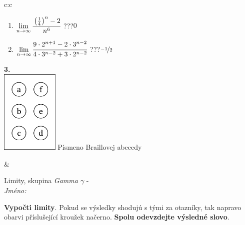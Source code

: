 \documentclass[10pt]{report}
\begin{document}
\begin{tabular}{c:c}
\begin{minipage}[c][104.5mm][t]{0.5\linewidth}
\begin{center}
\begin{minipage}{0.79\linewidth}
\begin{center}
\begin{varwidth}{\linewidth}
\begin{enumerate}
\item $\lim\limits_{n\to\infty}\cfrac{\left(\frac{1}{4}\right)^n -2}{n^{6}}$\quad \dotfill\; ???\;\dotfill \quad $0$
\item $\lim\limits_{n\to\infty}\cfrac{9\cdot 2^{n+1}-2\cdot 3^{n-2}}{4\cdot 3^{n-2}+3\cdot 2^{n-2}}$\quad \dotfill\; ???\;\dotfill \quad $\nicefrac{-1}{2}$
\end{enumerate}
\end{varwidth}
\end{center}
\end{minipage}
\begin{minipage}{0.20\linewidth}
\begin{center}
{\Huge\bfseries 3.} \\[2mm]
\includegraphics[height=40mm]{../images/braille.png}
{\small Písmeno Braillovej abecedy}
\end{center}
\end{minipage}
\end{center}
\end{minipage}
&
\begin{minipage}[c][104.5mm][t]{0.5\linewidth}
\begin{center}
\vspace{7mm}
{\huge Limity, skupina \textit{Gamma $\gamma$} -}\\[5mm]
\textit{Jméno:}\phantom{xxxxxxxxxxxxxxxxxxxxxxxxxxxxxxxxxxxxxxxxxxxxxxxxxxxxxxxxxxxxxxxxx}\\[5mm]
\begin{minipage}{0.95\linewidth}
\begin{center}
\textbf{Vypočti limity}. Pokud se výsledky shodujú s tými za otazníky, tak napravo\\obarvi příslušející kroužek načerno. \textbf{Spolu odevzdejte výsledné slovo}.
\end{center}
\end{minipage}
\\[1mm]
\begin{minipage}{0.79\linewidth}
\begin{center}
\begin{varwidth}{\linewidth}

\end{varwidth}
\end{center}
\end{minipage}
\end{center}
\end{minipage}
\end{tabular}
\end{document}
